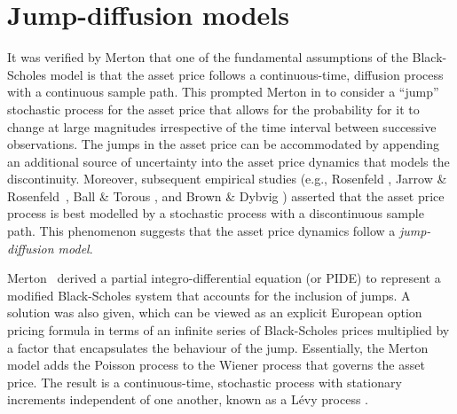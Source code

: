\section{Jump-diffusion models}
	It was verified by Merton \cite{Merton1973b} that one of the fundamental assumptions of the Black-Scholes model is that the asset price follows a continuous-time, diffusion process with a continuous sample path. This prompted Merton in \cite{Merton1976} to consider a ``jump'' stochastic process for the asset price that allows for the probability for it to change at large magnitudes irrespective of the time interval between successive observations. The jumps in the asset price can be accommodated by appending an additional source of uncertainty into the asset price dynamics that models the discontinuity. Moreover, subsequent empirical studies (e.g., Rosenfeld \cite{Rosenfeld1980}, Jarrow \& Rosenfeld~\cite{Jarrow1984}, Ball \& Torous \cite{Ball1985}, and Brown \& Dybvig \cite{Brown1986}) asserted that the asset price process is best modelled by a stochastic process with a discontinuous sample path. This phenomenon suggests that the asset price dynamics follow a  \emph{jump-diffusion model}.

Merton~\cite{Merton1976} derived a partial integro-differential equation (or PIDE) to represent a modified Black-Scholes system that accounts for the inclusion of jumps. A solution was also given, which can be viewed as an explicit European option pricing formula in terms of an infinite series of Black-Scholes prices multiplied by a factor that encapsulates the behaviour of the jump. Essentially, the Merton model adds the Poisson process to the Wiener process that governs the asset price. The result is a continuous-time, stochastic process with stationary increments independent of one another, known as a L\'{e}vy process \cite{Platen2010}.

